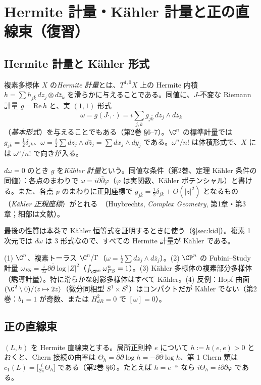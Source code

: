 
\section{Hermite 計量・Kähler 計量と正の直線束（復習）}\label{sec:herm}

\subsection{Hermite 計量と Kähler 形式}
複素多様体 $X$ の\emph{Hermite 計量}とは、$T^{1,0}X$ 上の Hermite 内積 $h=\sum h_{j\bar k}\,dz_j\otimes d\bar z_k$ を滑らかに与えることである。同値に、$J$-不変な Riemann 計量 $g=\mathrm{Re}\,h$ と、実 $(1,1)$ 形式
\[
\omega=g(J\cdot,\cdot)=i\sum_{j,k}g_{j\bar k}\,dz_j\wedge d\bar z_k
\]
（\emph{基本形式}）を与えることでもある（第2巻 \S6--7）。$\C^n$ の標準計量では $g_{j\bar k}=\frac12\delta_{jk}$、$\omega=\frac i2\sum dz_j\wedge d\bar z_j=\sum dx_j\wedge dy_j$ である。$\omega^n/n!$ は体積形式で、$X$ には $\omega^n/n!$ で向きが入る。

\begin{defn}[Kähler]
$d\omega=0$ のとき $g$ を\emph{Kähler 計量}という。同値な条件（第2巻、定理 Kähler 条件の同値）：各点のまわりで $\omega=i\partial\bar\partial\varphi$（$\varphi$ は実関数、Kähler ポテンシャル）と書ける。また、各点 $p$ のまわりに正則座標で $g_{j\bar k}=\frac12\delta_{jk}+O(|z|^2)$ となるもの（\emph{Kähler 正規座標}）がとれる\tC\ （Huybrechts, \emph{Complex Geometry}, 第1章・第3章；細部は文献）。
\end{defn}
最後の性質は本巻で Kähler 恒等式を証明するときに使う（\S\ref{sec:kid}）。複素 1 次元では $d\omega$ は 3 形式なので、すべての Hermite 計量が Kähler である。

\begin{ex}\label{ex:kahlerlist}
(1) $\C^n$、複素トーラス $\C^n/\Gamma$（$\omega=\frac i2\sum dz_j\wedge d\bar z_j$）。(2) $\CP^n$ の Fubini--Study 計量 $\omega_{FS}=\frac i{2\pi}\partial\bar\partial\log|Z|^2$（$\int_{\CP^n}\omega_{FS}^n=1$）。(3) Kähler 多様体の複素部分多様体（誘導計量）。特に滑らかな射影多様体はすべて Kähler。(4) 反例：Hopf 曲面 $(\C^2\setminus0)/\langle z\mapsto2z\rangle$（微分同相型 $S^1\times S^3$）はコンパクトだが Kähler でない（第2巻：$b_1=1$ が奇数、または $H^2_{dR}=0$ で $[\omega]=0$）。
\end{ex}

\subsection{正の直線束}
$(L,h)$ を Hermite 直線束とする。局所正則枠 $e$ について $h:=h(e,e)>0$ とおくと、Chern 接続の曲率は $\Theta_h=\bar\partial\partial\log h=-\partial\bar\partial\log h$、第 1 Chern 類は $c_1(L)=\big[\frac i{2\pi}\Theta_h\big]$ である（第2巻 \S6）。たとえば $h=e^{-\varphi}$ なら $i\Theta_h=i\partial\bar\partial\varphi$ である。

